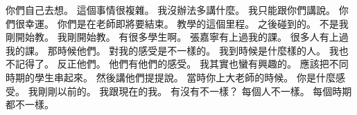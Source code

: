 \hypertarget{w01:cue:3599}{}你們自己去想。
\hypertarget{w01:cue:3600}{}這個事情很複雜。
\hypertarget{w01:cue:3601}{}我沒辦法多講什麼。
\hypertarget{w01:cue:3602}{}我只能跟你們講說。
\hypertarget{w01:cue:3603}{}你們很幸運。
\hypertarget{w01:cue:3604}{}你們是在老師即將要結束。
\hypertarget{w01:cue:3605}{}教學的這個里程。
\hypertarget{w01:cue:3606}{}之後碰到的。
\hypertarget{w01:cue:3607}{}不是我剛開始教。
\hypertarget{w01:cue:3608}{}我剛開始教。
\hypertarget{w01:cue:3609}{}有很多學生啊。
\hypertarget{w01:cue:3610}{}張嘉寧有上過我的課。
\hypertarget{w01:cue:3611}{}很多人有上過我的課。
\hypertarget{w01:cue:3612}{}那時候他們。
\hypertarget{w01:cue:3613}{}對我的感受是不一樣的。
\hypertarget{w01:cue:3614}{}我到時候是什麼樣的人。
\hypertarget{w01:cue:3615}{}我也不記得了。
\hypertarget{w01:cue:3616}{}反正他們。
\hypertarget{w01:cue:3617}{}他們有他們的感受。
\hypertarget{w01:cue:3618}{}我其實也蠻有興趣的。
\hypertarget{w01:cue:3619}{}應該把不同時期的學生串起來。
\hypertarget{w01:cue:3620}{}然後講他們提提說。
\hypertarget{w01:cue:3621}{}當時你上大老師的時候。
\hypertarget{w01:cue:3622}{}你是什麼感受。
\hypertarget{w01:cue:3623}{}我剛剛以前的。
\hypertarget{w01:cue:3624}{}我跟現在的我。
\hypertarget{w01:cue:3625}{}有沒有不一樣？
\hypertarget{w01:cue:3626}{}每個人不一樣。
\hypertarget{w01:cue:3627}{}每個時期都不一樣。

